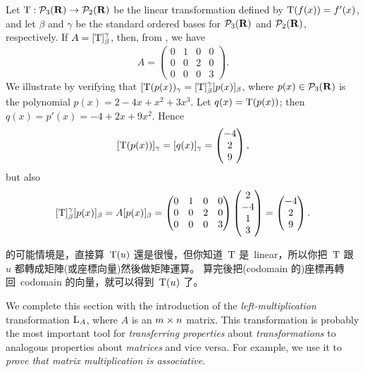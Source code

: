 \begin{example} \label{example 2.3.3}
Let \(\mathrm{T}: \mathcal{P}_3(\mathbf{R}) \to \mathcal{P}_2(\mathbf{R})\) be the linear transformation defined by \(\mathrm{T}(f(x)) = f'(x)\),
and let \(\beta\) and \(\gamma\) be the standard ordered bases for \(\mathcal{P}_3(\mathbf{R})\) and \(\mathcal{P}_2(\mathbf{R})\), respectively.
If \(A = [\mathrm{T}]_{\beta}^{\gamma}\), then, from , we have
\[
    A = \begin{pmatrix}
        0 & 1 & 0 & 0 \\
        0 & 0 & 2 & 0 \\
        0 & 0 & 0 & 3
    \end{pmatrix}.
\]
We illustrate  by verifying that \([\mathrm{T}(p(x))_{\gamma} = [\mathrm{T}]_{\beta}^{\gamma}[p(x)]_{\beta}\),
where \(p(x) \in \mathcal{P}_3(\mathbf{R})\) is the polynomial \(p(x) = 2 - 4x + x^2 + 3x^3\).
Let \(q(x) = \mathrm{T}(p(x))\);
then \(q(x) = p'(x) = -4 + 2x + 9x^2\).
Hence
\[
    [\mathrm{T}(p(x))]_{\gamma} = [q(x)]_{\gamma} = \begin{pmatrix}
        -4 \\ 2 \\ 9
    \end{pmatrix},
\]
but also
\[
    [\mathrm{T}]_{\beta}^{\gamma}[p(x)]_{\beta} = A [p(x)]_{\beta} = \begin{pmatrix}
        0 & 1 & 0 & 0 \\
        0 & 0 & 2 & 0 \\
        0 & 0 & 0 & 3
    \end{pmatrix}
    \begin{pmatrix}
        2 \\ -4 \\ 1 \\ 3
    \end{pmatrix}
    = \begin{pmatrix}
        -4 \\ 2 \\ 9
    \end{pmatrix}.
\]
\end{example}

\begin{note}
 的可能情境是，直接算\ \(\mathrm{T}(u)\) 還是很慢，但你知道\ \(\mathrm{T}\) 是\ linear，所以你把\ \(\mathrm{T}\) 跟\ \(u\) 都轉成矩陣(或座標向量)然後做矩陣運算。
算完後把(codomain 的)座標再轉回\ codomain 的向量，就可以得到\ \(\mathrm{T}(u)\) 了。
\end{note}

We complete this section with the introduction of the \emph{left-multiplication} transformation \(\mathrm{L}_A\), where \(A\) is an \(m \times n\) matrix.
This transformation is probably the most important tool for \emph{transferring properties} about \emph{transformations} to analogous properties about \emph{matrices} and vice versa.
For example, we use it to \emph{prove that matrix multiplication is associative}.

